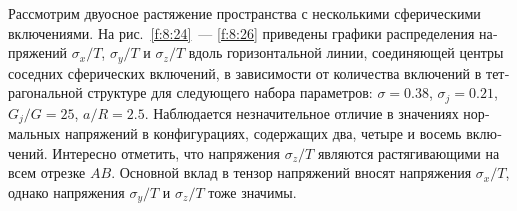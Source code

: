 \begin{russian}
%


Рассмотрим двуосное растяжение пространства с несколькими сферическими включениями. На рис.~\ref{f:8:24}~--- \ref{f:8:26} приведены графики распределения напряжений $\sigma_x/T$, $\sigma_y/T$ и $\sigma_z/T$ вдоль горизонтальной  линии, соединяющей центры соседних сферических включений, в зависимости от количества включений в тетрагональной структуре для следующего набора параметров: $\sigma=0.38$, $\sigma_j=0.21$, $G_j/G=25$, $a/R=2.5$. Наблюдается незначительное отличие в значениях нормальных напряжений в конфигурациях, содержащих два, четыре и восемь включений. Интересно отметить, что напряжения $\sigma_z/T$ являются растягивающими на всем отрезке $AB$. Основной вклад в тензор напряжений вносят напряжения $\sigma_x/T$, однако напряжения $\sigma_y/T$ и $\sigma_z/T$ тоже значимы.


\end{russian}
